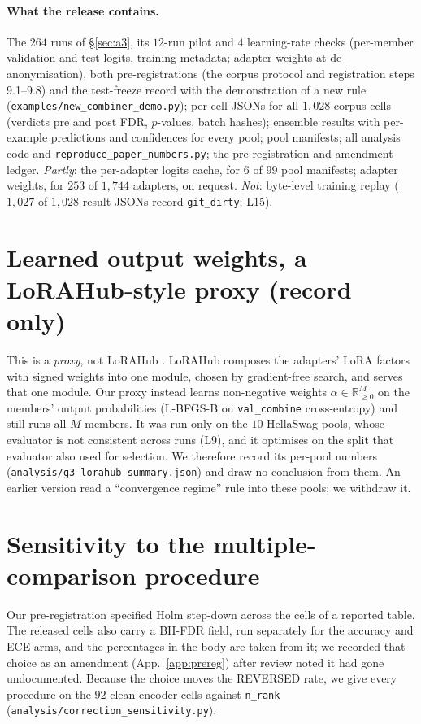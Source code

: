 \documentclass[11pt]{article}
\begin{document}
\paragraph{What the release contains.} The $264$ runs of \S\ref{sec:a3}, its $12$-run pilot and $4$ learning-rate checks (per-member validation and test logits, training metadata; adapter weights at de-anonymisation), both pre-registrations (the corpus protocol and registration steps 9.1--9.8) and the test-freeze record with the demonstration of a new rule (\texttt{examples/\allowbreak new\_\allowbreak combiner\_\allowbreak demo.\allowbreak py}); per-cell JSONs for all $1{,}028$ corpus cells (verdicts pre and post FDR, $p$-values, batch hashes); ensemble results with per-example predictions and confidences for every pool; pool manifests; all analysis code and \texttt{reproduce\_\allowbreak paper\_\allowbreak numbers.\allowbreak py}; the pre-registration and amendment ledger. \emph{Partly}: the per-adapter logits cache, for $6$ of $99$ pool manifests; adapter weights, for $253$ of $1{,}744$ adapters, on request. \emph{Not}: byte-level training replay ($1{,}027$ of $1{,}028$ result JSONs record \texttt{git\_dirty}; L15).

\section{Learned output weights, a LoRAHub-style proxy (record only)}\label{app:lorahub}
This is a \emph{proxy}, not LoRAHub \citep{huang2023lorahub}. LoRAHub composes the adapters' LoRA factors with signed weights into one module, chosen by gradient-free search, and serves that one module. Our proxy instead learns non-negative weights $\alpha\!\in\!\mathbb{R}_{\geq 0}^M$ on the members' output probabilities (L-BFGS-B on \texttt{val\_combine} cross-entropy) and still runs all $M$ members. It was run only on the $10$ HellaSwag pools, whose evaluator is not consistent across runs (L9), and it optimises on the split that evaluator also used for selection. We therefore record its per-pool numbers (\texttt{analysis/\allowbreak g3\_\allowbreak lorahub\_\allowbreak summary.\allowbreak json}) and draw no conclusion from them. An earlier version read a ``convergence regime'' rule into these pools; we withdraw it.

\section{Sensitivity to the multiple-comparison procedure}\label{app:correction}
Our pre-registration specified Holm step-down across the cells of a reported table. The
released cells also carry a BH-FDR field, run separately for the accuracy and ECE arms, and
the percentages in the body are taken from it; we recorded that choice as an amendment (App.~\ref{app:prereg}) after review
noted it had gone undocumented. Because the choice moves the REVERSED rate, we give every
procedure on the $92$ clean encoder cells against \texttt{n\_rank}
(\texttt{analysis/\allowbreak correction\_\allowbreak sensitivity.\allowbreak py}).
\end{document}
